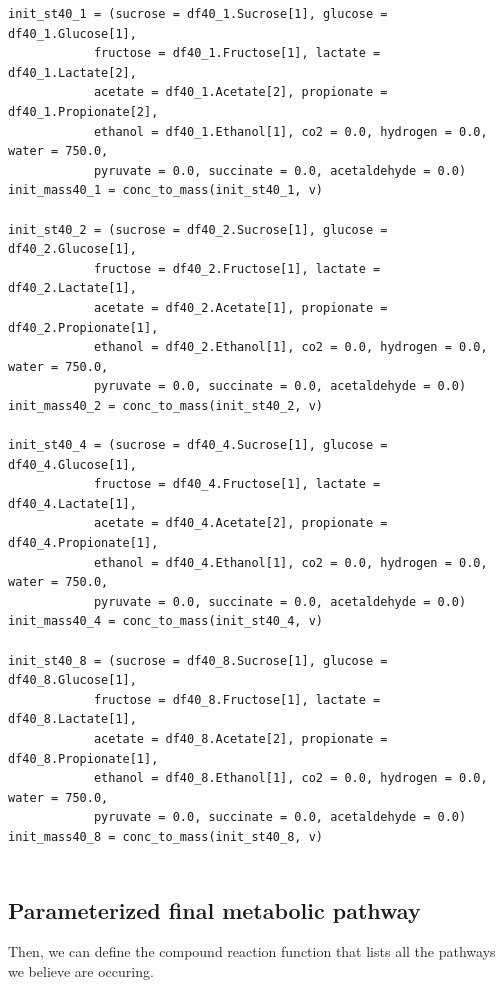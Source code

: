 \documentclass[11pt]{article}
\begin{document}
\begin{verbatim}
init_st40_1 = (sucrose = df40_1.Sucrose[1], glucose = df40_1.Glucose[1],
            fructose = df40_1.Fructose[1], lactate = df40_1.Lactate[2],
            acetate = df40_1.Acetate[2], propionate = df40_1.Propionate[2],
            ethanol = df40_1.Ethanol[1], co2 = 0.0, hydrogen = 0.0, water = 750.0,
            pyruvate = 0.0, succinate = 0.0, acetaldehyde = 0.0)
init_mass40_1 = conc_to_mass(init_st40_1, v)

init_st40_2 = (sucrose = df40_2.Sucrose[1], glucose = df40_2.Glucose[1],
            fructose = df40_2.Fructose[1], lactate = df40_2.Lactate[1],
            acetate = df40_2.Acetate[1], propionate = df40_2.Propionate[1],
            ethanol = df40_2.Ethanol[1], co2 = 0.0, hydrogen = 0.0, water = 750.0,
            pyruvate = 0.0, succinate = 0.0, acetaldehyde = 0.0)
init_mass40_2 = conc_to_mass(init_st40_2, v)

init_st40_4 = (sucrose = df40_4.Sucrose[1], glucose = df40_4.Glucose[1],
            fructose = df40_4.Fructose[1], lactate = df40_4.Lactate[1],
            acetate = df40_4.Acetate[2], propionate = df40_4.Propionate[1],
            ethanol = df40_4.Ethanol[1], co2 = 0.0, hydrogen = 0.0, water = 750.0,
            pyruvate = 0.0, succinate = 0.0, acetaldehyde = 0.0)
init_mass40_4 = conc_to_mass(init_st40_4, v)

init_st40_8 = (sucrose = df40_8.Sucrose[1], glucose = df40_8.Glucose[1],
            fructose = df40_8.Fructose[1], lactate = df40_8.Lactate[1],
            acetate = df40_8.Acetate[2], propionate = df40_8.Propionate[1],
            ethanol = df40_8.Ethanol[1], co2 = 0.0, hydrogen = 0.0, water = 750.0,
            pyruvate = 0.0, succinate = 0.0, acetaldehyde = 0.0)
init_mass40_8 = conc_to_mass(init_st40_8, v)


\end{verbatim}

\subsection{Parameterized final metabolic pathway}
\label{sec:org5b4d303}
Then, we can define the compound reaction function that lists all the pathways we believe are occuring.
\end{document}
